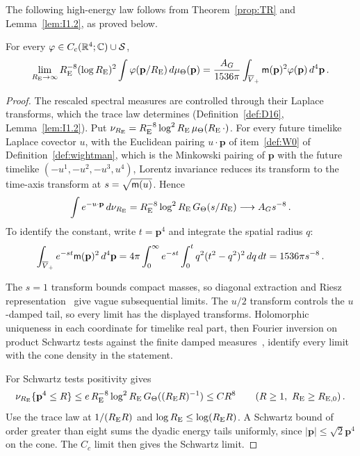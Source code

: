 The following high-energy law follows from Theorem~\ref{prop:TR} and Lemma~\ref{lem:I1.2}, as proved below.
\begin{lemma}\label{lem:I1.3}
For every $\varphi\in C_c(\mathbb{R}^4;\mathbb{C})\cup\mathcal S$,
\begin{equation*}
\lim_{R_{\rm E}\to\infty}R_{\rm E}^{-8}(\log R_{\rm E})^2\int\varphi(\mathbf p/R_{\rm E})\,d\mu_{\Theta}(\mathbf p)
=\frac{A_G}{1536\pi}\int_{\overline{V}_+}\mathsf{m}(\mathbf p)^2\varphi(\mathbf p)\,d^4\mathbf p\,.
\end{equation*}
\end{lemma}
\begin{proof}
The rescaled spectral measures are controlled through their Laplace transforms, which the trace law determines (Definition~\ref{def:D16}, Lemma~\ref{lem:I1.2}). Put $\nu_{R_{\rm E}}=R_{\rm E}^{-8}\log^2R_{\rm E}\,\mu_{\Theta}(R_{\rm E}\,\cdot)$. For every future timelike Laplace covector $u$, with the Euclidean pairing $u\cdot\mathbf p$ of item~\ref{def:W0} of Definition~\ref{def:wightman}, which is the Minkowski pairing of $\mathbf p$ with the future timelike $(-u^1,-u^2,-u^3,u^4)$, Lorentz invariance reduces its transform to the time-axis transform at $s=\sqrt{\mathsf{m}(u)}$. Hence
\begin{equation*}
\int e^{-u\cdot\mathbf p}\,d\nu_{R_{\rm E}}
=R_{\rm E}^{-8}\log^2R_{\rm E}\,G_{\Theta}(s/R_{\rm E})
\longrightarrow A_G s^{-8}\,.
\end{equation*}
To identify the constant, write $t=\mathbf p^4$ and integrate the spatial radius $q$:
\begin{equation*}
\int_{\overline{V}_+}e^{-st}\mathsf{m}(\mathbf p)^2\,d^4\mathbf p
=4\pi\int_0^\infty e^{-st}\int_0^t q^2(t^2-q^2)^2\,dq\,dt
=1536\pi s^{-8}\,.
\end{equation*}

The $s=1$ transform bounds compact masses, so diagonal extraction and Riesz representation~\cite[Theorem~2.14]{Rudin1987} give vague subsequential limits. The $u/2$ transform controls the $u$-damped tail, so every limit has the displayed transforms. Holomorphic uniqueness in each coordinate for timelike real part, then Fourier inversion on product Schwartz tests against the finite damped measures~\cite[Theorems~10.18 and~9.11]{Rudin1987}, identify every limit with the cone density in the statement.

For Schwartz tests positivity gives
\begin{equation*}
\nu_{R_{\rm E}}\{\mathbf p^4\le R\}\le e\,R_{\rm E}^{-8}\log^2R_{\rm E}\,G_{\Theta}((R_{\rm E} R)^{-1})\le CR^8
\qquad(R\ge1,\ R_{\rm E}\ge R_{{\rm E},0})\,.
\end{equation*}
Use the trace law at $1/(R_{\rm E}R)$ and $\log R_{\rm E}\le\log(R_{\rm E}R)$. A Schwartz bound of order greater than eight sums the dyadic energy tails uniformly, since $|\mathbf p|\le\sqrt2\mathbf p^4$ on the cone. The $C_c$ limit then gives the Schwartz limit.
\end{proof}

